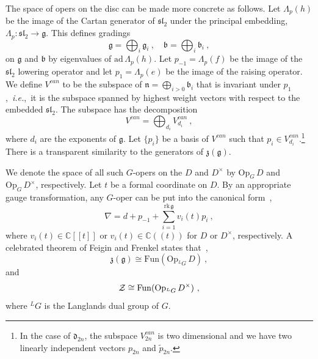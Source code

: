 \documentclass[a4paper]{article}
\def\IC{\mathbb{C}}
\def\ZZ{{\cal Z}}
\def\df{\mathfrak{d}}
\def\gf{\mathfrak{g}}
\def \zf{\mathfrak{z}}
\def \ie{{\it i.e.}}
\begin{document}
The space of opers on the disc can be made more concrete as follows. Let $\Lambda_p(h)$ be the image of the Cartan generator of $\mathfrak{sl}_2$ under the principal embedding, $\Lambda_{p}:\mathfrak{sl}_2\rightarrow \gf$. This defines gradings
\begin{equation}
	\gf = \bigoplus_{i} \gf_i~,\quad \mathfrak{b} = \bigoplus_i\mathfrak{b}_i~,
\end{equation}
on $\gf$ and $\mathfrak{b}$ by eigenvalues of $\mathrm{ad}\, \Lambda_p(h)$. Let $p_{-1} = \Lambda_p(f)$ be the image of the $\mathfrak{sl}_2$ lowering operator and let $p_1=\Lambda_p(e)$ be the image of the raising operator. We define $V^{can}$ to be the subspace of $\mathfrak{n}= \bigoplus_{i>0}\mathfrak{b}_i$ that is invariant under $p_1$,~\ie,~it is the subspace spanned by highest weight vectors with respect to the embedded $\mathfrak{sl}_2$. The subspace has the decomposition
\begin{equation}
	V^{can} = \bigoplus_{d_i} V_{d_i}^{can}~,
\end{equation}
where $d_i$ are the exponents of $\gf$. Let $\{p_i\}$ be a basis of $V^{can}$ such that $p_i\in V^{can}_{d_i}$.\footnote{In the case of $\df_{2n}$, the subspace $V^{can}_{2n}$ is two dimensional and we have two linearly independent vectors $p_{2n}$ and $\tilde{p}_{2n}$.} There is a transparent similarity to the generators of $\zf(\gf)$.

We denote the space of all such $G$-opers on the $D$ and $D^\times$ by $\mathrm{Op}_{G}\, D$ and $\mathrm{Op}_{G}\, D^\times$, respectively. Let $t$ be a formal coordinate on $D$. By an appropriate gauge transformation, any $G$-oper can be put into the canonical form~\cite{Frenkel:2007},
\begin{equation}
	\nabla = d + p_{-1} + \sum_{i=1}^{\mathrm{rk}\,\gf}v_i(t)p_i~,
\end{equation}
where $v_i(t)\in\IC[\![t]\!]$ or $v_i(t)\in\IC(\!(t)\!)$ for $D$ or $D^\times$, respectively. A celebrated theorem of Feigin and Frenkel states that~\cite{Feigin:1984},
\begin{equation}
	\zf(\gf) \cong \mathrm{Fun}( \mathrm{Op}_{^L G}\, D)~,
\end{equation}
and
\begin{equation}
	\ZZ \cong \mathrm{Fun}(\mathrm{Op}_{^L G}\, D^\times)~,
\end{equation}
where $^L G$ is the Langlands dual group of $G$.
\end{document}
